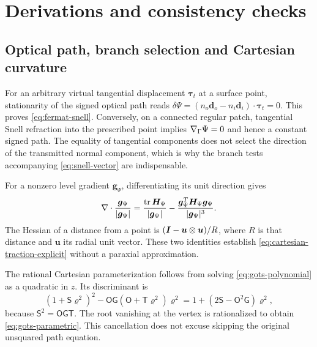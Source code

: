 \section{Derivations and consistency checks}\label{sec:derivations}

\subsection{Optical path, branch selection and Cartesian curvature}
For an arbitrary virtual tangential displacement $\bm\tau_t$ at a surface
point, stationarity of the signed optical path reads
$\delta\Psi=(n_o\bm d_o-n_i\bm d_i)\cdot\bm\tau_t=0$. This proves
\cref{eq:fermat-snell}. Conversely, on a connected regular patch, tangential
Snell refraction into the prescribed point implies $\nabla_\Gamma\Psi=0$ and hence a
constant signed path. The equality of tangential components does not select
the direction of the transmitted normal component, which is why the branch
tests accompanying \cref{eq:snell-vector} are indispensable.

For a nonzero level gradient $\bm g_\Psi$, differentiating its unit direction
gives
\begin{equation}
 \nabla\cdot\frac{\bm g_\Psi}{|\bm g_\Psi|}
 =\frac{\operatorname{tr}\bm H_\Psi}{|\bm g_\Psi|}
  -\frac{\bm g_\Psi^T\bm H_\Psi\bm g_\Psi}{|\bm g_\Psi|^3}.
 \label{eq:implicit-curvature-proof}
\end{equation}
The Hessian of a distance from a point is
$(\bm I-\bm u\otimes\bm u)/R$, where $R$ is that distance and $\bm u$ its radial
unit vector. These two identities establish
\cref{eq:cartesian-traction-explicit} without a paraxial approximation.

The rational Cartesian parameterization follows from solving
\cref{eq:gots-polynomial} as a quadratic in $z$. Its discriminant is
\begin{equation}
 (1+\mathsf S\varrho^2)^2
 -\mathsf O\mathsf G(\mathsf O+\mathsf T\varrho^2)\varrho^2
 =1+(2\mathsf S-\mathsf O^2\mathsf G)\varrho^2,
 \label{eq:gots-discriminant}
\end{equation}
because $\mathsf S^2=\mathsf O\mathsf G\mathsf T$. The root vanishing at the
vertex is rationalized to obtain \cref{eq:gots-parametric}. This cancellation
does not excuse skipping the original unsquared path equation.

